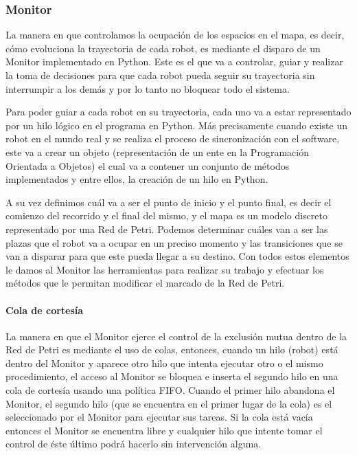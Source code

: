 \subsubsection{Monitor}

La manera en que controlamos la ocupación de los espacios en el mapa, es decir, cómo evoluciona la trayectoria de cada robot, es mediante el disparo de un Monitor implementado en Python. Este es el que va a controlar, guiar y realizar la toma de decisiones para que cada robot pueda seguir su trayectoria sin interrumpir a los demás y por lo tanto no bloquear todo el sistema.

Para poder guiar a cada robot en su trayectoria, cada uno va a estar representado por un hilo lógico en el programa en Python. Más precisamente cuando existe un robot en el mundo real y se realiza el proceso de sincronización con el software, este va a crear un objeto (representación de un ente en la Programación Orientada a Objetos) el cual va a contener un conjunto de métodos implementados y entre ellos, la creación de un hilo en Python.

A su vez definimos cuál va a ser el punto de inicio y el punto final, es decir el comienzo del recorrido y el final del mismo, y el mapa es un modelo discreto representado por una Red de Petri. Podemos determinar cuáles van a ser las plazas que el robot va a ocupar en un preciso momento y las transiciones que se van a disparar para que este pueda llegar a su destino. Con todos estos elementos le damos al Monitor las herramientas para realizar su trabajo y efectuar los métodos que le permitan modificar el marcado de la Red de Petri.

\paragraph{Cola de cortesía} \mbox{} \vspace{8pt}

La manera en que el Monitor ejerce el control de la exclusión mutua dentro de la Red de Petri es mediante el uso de colas, entonces, cuando un hilo (robot) está dentro del Monitor y aparece otro hilo que intenta ejecutar otro o el mismo procedimiento, el acceso al Monitor se bloquea e inserta el segundo hilo en una cola de cortesía usando una política FIFO. Cuando el primer hilo abandona el Monitor, el segundo hilo (que se encuentra en el primer lugar de la cola) es el seleccionado por el Monitor para ejecutar sus tareas. Si la cola está vacía entonces el Monitor se encuentra libre y cualquier hilo que intente tomar el control de éste último podrá hacerlo sin intervención alguna.

